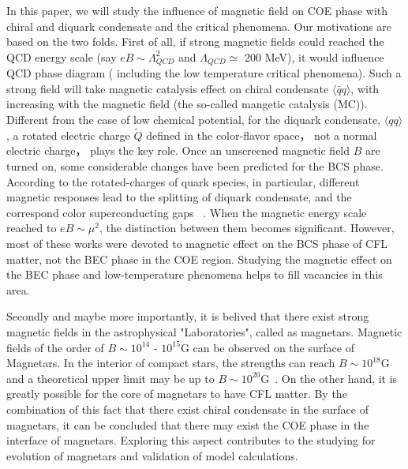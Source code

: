 \documentclass[prd, showpacs,nofootinbib,amsmath,amssymb,12pt]{revtex4}
\begin{document}
In this paper, we will study the influence of magnetic field on  COE phase with chiral and diquark condensate and the critical phenomena.
Our motivations are based on the two folds.
First of all, if  strong magnetic fields could reached the QCD energy scale 
 (say $eB \sim \Lambda_{QCD}^2$ and $\Lambda_{QCD} \simeq$ 200 MeV),  it  would influence QCD phase diagram ( including
the low temperature critical phenomena).
Such a strong field will take magnetic catalysis effect on chiral condensate
$\langle \bar{q}q \rangle$, with increasing  with the magnetic field (the so-called mangetic catalysis (MC)).
Different from the case of low chemical potential, 
for the diquark condensate,  $\langle q q\rangle$,
 a rotated electric charge $\widetilde{Q}$ defined in the color-flavor space，
not a normal electric charge，
 plays the key role. 
Once an unscreened magnetic field $B$ are turned on, some considerable changes have been predicted for the BCS phase.
According to the rotated-charges of quark species, in particular, different magnetic responses lead to the splitting of diquark condensate,
and the correspond color superconducting gaps ~\cite{ferrer2005magnetic,fukushima2008color,ferrer2006color,ferrer2007magnetic}.
When the magnetic energy scale reached to $eB \sim \mu^2$, the distinction between them becomes significant.
However, most of these works were devoted to magnetic effect on the BCS phase of CFL matter, not the BEC  phase in the COE region.
Studying the magnetic effect on the BEC phase   and 
low-temperature phenomena helps to fill vacancies in this area.
    


Secondly and maybe more importantly, it is belived that  there exist strong magnetic fields in the astrophysical "Laboratories",
called as magnetars.
Magnetic fields of the order of $B \sim 10^{14}$ - $10^{15}\text{G}$ can be observed on the surface of Magnetars.
In the interior of compact stars, the strengths can reach $B \sim 10^{18}\text{G}$ and a theoretical upper limit may be up to $B \sim 10^{20}\text{G}$~\cite{lai1991cold}.
On the other hand, it is greatly possible for the core of magnetars to have 
CFL matter.
By the combination of this fact that there exist chiral condensate in the surface of
magnetars, it can be concluded that there may exist the COE phase  in the interface of
magnetars.
Exploring this aspect contributes to the studying for evolution of magnetars and 
validation of model calculations.
\end{document}
